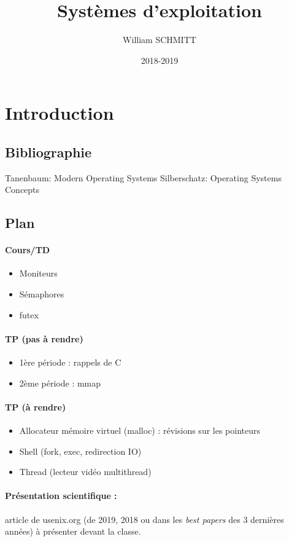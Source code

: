 \documentclass[11pt]{article}
\title{Systèmes d'exploitation}
\author{William SCHMITT}
\date{2018-2019}
\begin{document}
\maketitle

\section{Introduction}
\subsection{Bibliographie}

Tanenbaum: Modern Operating Systems
Silberschatz: Operating Systems Concepts

\subsection{Plan}

\paragraph{Cours/TD}
\begin{itemize}
    \item Moniteurs
    \item Sémaphores
    \item futex
\end{itemize}

\paragraph{TP (pas à rendre)}
\begin{itemize}
    \item 1ère période : rappels de C
    \item 2ème période : mmap
\end{itemize}

\paragraph{TP (à rendre)}
\begin{itemize}
    \item Allocateur mémoire virtuel (malloc) : révisions sur les pointeurs
    \item Shell (fork, exec, redirection IO)
    \item Thread (lecteur vidéo multithread)
\end{itemize}

\paragraph{Présentation scientifique :} article de usenix.org (de 2019, 2018 ou dans les \textit{best papers} des 3 dernières années) à présenter devant la classe.
\end{document}
